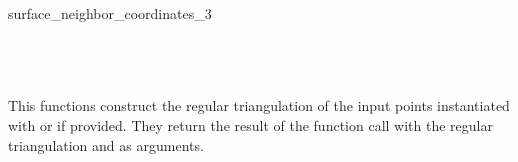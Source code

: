 \begin{ccRefFunction}{surface_neighbor_coordinates_3}
\ccSeeAlso
{} \\
\\ 
\\  
\\

\ccImplementation This functions construct the regular triangulation of the input points 
instantiated with  or  if provided. 
They return the result of the function call 
 with the regular triangulation and  as arguments.

\end{ccRefFunction}


